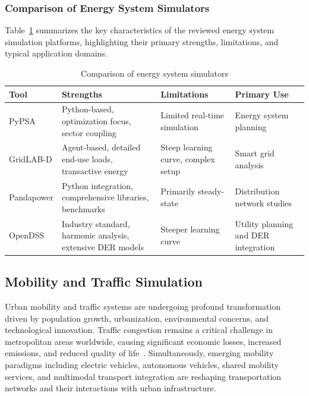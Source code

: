 \subsubsection{Comparison of Energy System Simulators}

Table~\ref{tab:energy_comparison} summarizes the key characteristics of the reviewed energy system simulation platforms, highlighting their primary strengths, limitations, and typical application domains.

\begin{table}[h]
    \centering
    \caption{Comparison of energy system simulators}
    \label{tab:energy_comparison}
    \begin{tabular}{|p{2.5cm}|p{3.5cm}|p{3.5cm}|p{3cm}|}
        \hline
        \textbf{Tool} & \textbf{Strengths} & \textbf{Limitations} & \textbf{Primary Use} \\
        \hline
        PyPSA & Python-based, optimization focus, sector coupling & Limited real-time simulation & Energy system planning \\
        \hline
        GridLAB-D & Agent-based, detailed end-use loads, transactive energy & Steep learning curve, complex setup & Smart grid analysis \\
        \hline
        Pandapower & Python integration, comprehensive libraries, benchmarks & Primarily steady-state & Distribution network studies \\
        \hline
        OpenDSS & Industry standard, harmonic analysis, extensive DER models & Steeper learning curve & Utility planning and DER integration \\
        \hline
    \end{tabular}
\end{table}


\subsection{Mobility and Traffic Simulation}

Urban mobility and traffic systems are undergoing profound transformation driven by population growth, urbanization, environmental concerns, and technological innovation. Traffic congestion remains a critical challenge in metropolitan areas worldwide, causing significant economic losses, increased emissions, and reduced quality of life~\cite{mobility_challenges}. Simultaneously, emerging mobility paradigms including electric vehicles, autonomous vehicles, shared mobility services, and multimodal transport integration are reshaping transportation networks and their interactions with urban infrastructure.

